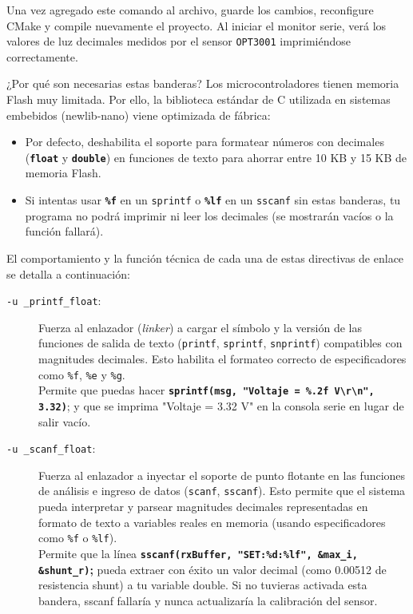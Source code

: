 \documentclass[
10pt, %
a4paper, %
oneside, %
headinclude,footinclude, %
BCOR5mm, %
]{scrartcl}
\begin{document}
Una vez agregado este comando al archivo, guarde los cambios, reconfigure CMake y compile nuevamente el proyecto. Al iniciar el monitor serie, verá los valores de luz decimales medidos por el sensor \texttt{OPT3001} imprimiéndose correctamente.

\begin{WarningBox}{¿Por qué son necesarias estas banderas?}
Los microcontroladores tienen memoria Flash muy limitada. Por ello, la biblioteca estándar de C utilizada en sistemas embebidos (newlib-nano) viene optimizada de fábrica:
\begin{itemize}
	\item Por defecto, deshabilita el soporte para formatear números con decimales (\texttt{\textbf{float}} y \texttt{\textbf{double}}) en funciones de texto para ahorrar entre 10 KB y 15 KB de memoria Flash.
	\item Si intentas usar \texttt{\textbf{\%f}} en un \texttt{sprintf} o \texttt{\textbf{\%lf}} en un \texttt{sscanf} sin estas banderas, tu programa no podrá imprimir ni leer los decimales (se mostrarán vacíos o la función fallará).
\end{itemize}
\end{WarningBox}

El comportamiento y la función técnica de cada una de estas directivas de enlace se detalla a continuación:
\begin{description}
	\item[\texttt{-u \_printf\_float}:] Fuerza al enlazador (\textit{linker}) a cargar el símbolo y la versión de las funciones de salida de texto (\texttt{printf}, \texttt{sprintf}, \texttt{snprintf}) compatibles con magnitudes decimales. Esto habilita el formateo correcto de especificadores como \texttt{\%f}, \texttt{\%e} y \texttt{\%g}.\\
	Permite que puedas hacer \textbf{\texttt{sprintf(msg, "Voltaje = \%.2f V\textbackslash r\textbackslash n", 3.32)}}; y que se imprima "Voltaje = 3.32 V" en la consola serie en lugar de salir vacío.
	
	\item[\texttt{-u \_scanf\_float}:] Fuerza al enlazador a inyectar el soporte de punto flotante en las funciones de análisis e ingreso de datos (\texttt{scanf}, \texttt{sscanf}). Esto permite que el sistema pueda interpretar y parsear magnitudes decimales representadas en formato de texto a variables reales en memoria (usando especificadores como \texttt{\%f} o \texttt{\%lf}).\\
	 Permite que la línea \textbf{\texttt{sscanf(rxBuffer, "SET:\%d:\%lf", \&max\_i, \&shunt\_r)};} pueda extraer con éxito un valor decimal (como 0.00512 de resistencia shunt) a tu variable double. Si no tuvieras activada esta bandera, sscanf fallaría y nunca actualizaría la calibración del sensor.
\end{description}
\end{document}
